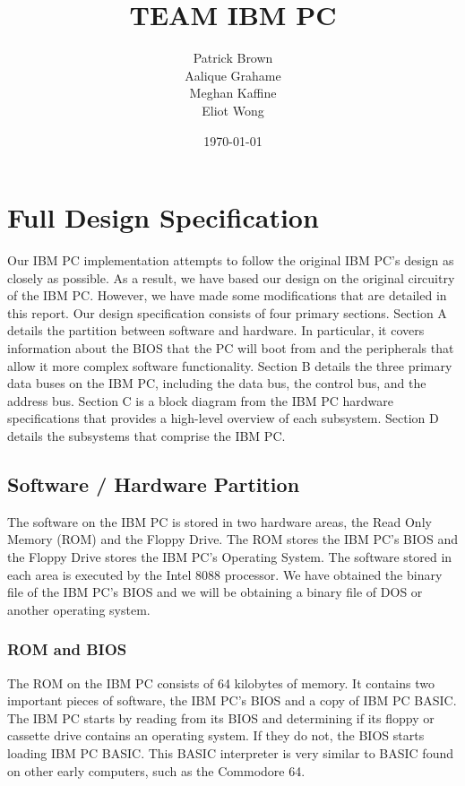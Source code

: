 \documentclass[12pt, letterpaper]{article}
\title{TEAM IBM PC}
\author{Patrick Brown\\
    Aalique Grahame\\
    Meghan Kaffine\\
    Eliot Wong}
\date{\today}
\begin{document}
\vfill
\maketitle
\clearpage

\tableofcontents
\clearpage

\section{Full Design Specification}

    Our IBM PC implementation attempts to follow the original IBM PC’s design as closely as possible. As a result, we have based our design on the original circuitry of the IBM PC. However, we have made some modifications that are detailed in this report. Our design specification consists of four primary sections. Section A details the partition between software and hardware. In particular, it covers information about the BIOS that the PC will boot from and the peripherals that allow it more complex software functionality. Section B details the three primary data buses on the IBM PC, including the data bus, the control bus, and the address bus. Section C is a block diagram from the IBM PC hardware specifications that provides a high-level overview of each subsystem. Section D details the subsystems that comprise the IBM PC. 

\subsection{Software / Hardware Partition}

The software on the IBM PC is stored in two hardware areas, the Read Only Memory (ROM) and the Floppy Drive. The ROM stores the IBM PC’s BIOS and the Floppy Drive stores the IBM PC’s Operating System. The software stored in each area is executed by the Intel 8088 processor. We have obtained the binary file of the IBM PC’s BIOS and we will be obtaining a binary file of DOS or another operating system. 

\subsubsection{ROM and BIOS}

    The ROM on the IBM PC consists of 64 kilobytes of memory. It contains two important pieces of software, the IBM PC’s BIOS and a copy of IBM PC BASIC. The IBM PC starts by reading from its BIOS and determining if its floppy or cassette drive contains an operating system. If they do not, the BIOS starts loading IBM PC BASIC. This BASIC interpreter is very similar to BASIC found on other early computers, such as the Commodore 64. 
        
\end{document}
